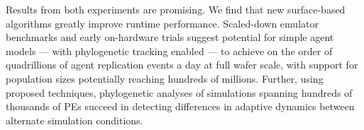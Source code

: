 Results from both experiments are promising.
We find that new surface-based algorithms greatly improve runtime performance.
Scaled-down emulator benchmarks and early on-hardware trials suggest potential for simple agent models --- with phylogenetic tracking enabled --- to achieve on the order of quadrillions of agent replication events a day at full wafer scale, with support for population sizes potentially reaching hundreds of millions.
Further, using proposed techniques, phylogenetic analyses of simulations spanning hundreds of thousands of PEs succeed in detecting differences in adaptive dynamics between alternate simulation conditions.




